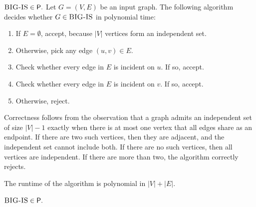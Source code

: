\documentclass[11pt,addpoints,answers]{exam}
\begin{document}
\begin{questions}
    \begin{solution}
    \(\textsc{BIG-IS} \in \mathsf{P}.\) Let \(G=(V,E)\) be an input graph. The following algorithm decides whether \(G \in \textsc{BIG-IS}\) in polynomial time:
    
    \begin{enumerate}
      \item If \(E = \emptyset\), accept, because \(\lvert V \rvert\) vertices form an independent set.
      \item Otherwise, pick any edge \((u,v) \in E\).
      \item Check whether every edge in \(E\) is incident on \(u\). If so, accept.
      \item Check whether every edge in \(E\) is incident on \(v\). If so, accept.
      \item Otherwise, reject.
    \end{enumerate}
    
    Correctness follows from the observation that a graph admits an independent set of size \(\lvert V \rvert - 1\) exactly when there is at most one vertex that all edges share as an endpoint. If there are two such vertices, then they are adjacent, and the independent set cannot include both.  If there are no such vertices, then all vertices are independent. If there are more than two, the algorithm correctly rejects.

    The runtime of the algorithm is polynomial in \(\lvert V \rvert + \lvert E \rvert\). 
    
    \(\textsc{BIG-IS} \in \mathsf{P}.\)
    \end{solution}

\end{questions}
\end{document}
